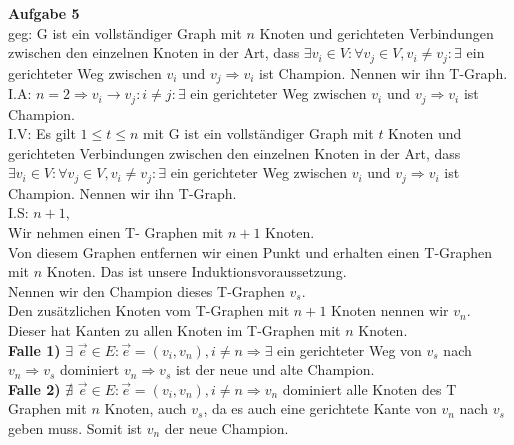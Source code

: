 \documentclass[a4paper]{scrartcl}
\begin{document}
	\begin{flushleft}
		\textbf{Aufgabe 5}\\
		geg: G ist ein vollständiger Graph mit $n$ Knoten und gerichteten Verbindungen zwischen den einzelnen Knoten in der Art, dass $\exists v_i\in V: \forall v_j\in V ,v_i\neq v_j: \exists$ ein gerichteter Weg zwischen $v_i$ und $v_j\Rightarrow v_i$ ist Champion. Nennen wir ihn T-Graph.\\[1em]
		I.A: $n=2\Rightarrow v_i\rightarrow v_j:i\neq j:\exists$ ein gerichteter Weg zwischen $v_i$ und $v_j\Rightarrow v_i$ ist Champion.\\
		I.V: Es gilt $1\leq t \leq n$ mit G ist ein vollständiger Graph mit $t$ Knoten und gerichteten Verbindungen zwischen den einzelnen Knoten in der Art, dass $\exists v_i\in V: \forall v_j\in V ,v_i\neq v_j: \exists$ ein gerichteter Weg zwischen $v_i$ und $v_j\Rightarrow v_i$ ist Champion. Nennen wir ihn T-Graph.\\
		I.S: $n+1$,\\
		Wir nehmen einen T- Graphen mit $n+1$ Knoten. \\
		Von diesem Graphen entfernen wir einen Punkt und erhalten einen T-Graphen mit $n$ Knoten. Das ist unsere Induktionsvoraussetzung. \\
		Nennen wir den Champion dieses T-Graphen $v_s$.\\
		Den zusätzlichen Knoten vom T-Graphen mit $n+1$ Knoten nennen wir $v_n$.\\
		Dieser hat Kanten zu allen Knoten im T-Graphen mit $n$ Knoten.\\[1em]
		\textbf{Falle 1)} $\exists$ $\overrightarrow{e}\in E: \overrightarrow{e}=(v_i,v_n), i\neq n \Rightarrow \exists$ ein gerichteter Weg von $v_s$ nach $v_n \Rightarrow v_s$ dominiert $v_n \Rightarrow v_s$ ist der neue und alte Champion.\\    
		\textbf{Falle 2)} $\nexists$ $\overrightarrow{e}\in E: \overrightarrow{e}=(v_i,v_n), i\neq n \Rightarrow v_n$ dominiert alle Knoten des T Graphen mit $n$ Knoten, auch $v_s$, da es auch eine gerichtete Kante von $v_n$ nach $v_s$ geben muss. Somit ist $v_n$ der neue Champion.\\
		
 	\end{flushleft}
\end{document}
